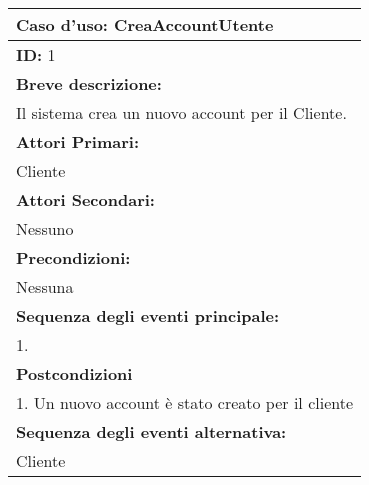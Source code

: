 \begin{tabular}{|l|}
    \hline
    \textbf{Caso d'uso: CreaAccountUtente}  \\
    \hline
    \textbf{ID:} 1          \\
    \hline
    \textbf{Breve descrizione:} \\
    Il sistema crea un nuovo account per il Cliente. \\
    \hline
    \textbf{Attori Primari:} \\
    Cliente \\
    \hline
    \textbf{Attori Secondari:} \\
    Nessuno \\
    \hline
    \textbf{Precondizioni:} \\
    Nessuna \\
    \hline
    \textbf{Sequenza degli eventi principale:} \\
    
    1. 
    \\
    \hline
    \textbf{Postcondizioni} \\
    1. Un nuovo account è stato creato per il cliente \\
    \hline
    \textbf{Sequenza degli eventi alternativa:} \\
    Cliente \\
    \hline
\end{tabular}